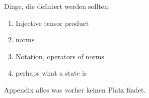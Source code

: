 Dinge, die definiert werden sollten. 
\begin{enumerate}
	\item Injective tensor product 
	\item norms
	\item Notation, operators of norms 
	\item  perhaps what a state is 
\end{enumerate}


Appendix alles was vorher keinen Platz findet. 